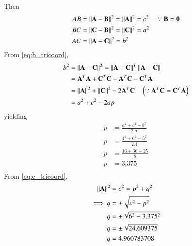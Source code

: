 \documentclass[journal,12pt,twocolumn]{IEEEtran}
\begin{document}
Then
\begin{align}
\label{eq:c_tricoord}
AB &= \left\lVert\mathbf{A}-\mathbf{B}\right\rVert^2 = \left\lVert\mathbf{A}\right\rVert^2  = c^2 \quad \because \mathbf{B} = \mathbf{0}
\\
\label{eq:a_tricoord}
BC &= \left\lVert\mathbf{C}-\mathbf{B}\right\rVert^2 = \left\lVert\mathbf{C}\right\rVert^2  = a^2
\\
AC &= \left\lVert\mathbf{A}-\mathbf{C}\right\rVert^2 =    b^2
\label{eq:b_tricoord}
\end{align}
%
From \eqref{eq:b_tricoord},
\begin{align}
b^2 &=\left\lVert\mathbf{A}-\mathbf{C}\right\rVert^2 = \left\lVert\mathbf{A}-\mathbf{C}\right\rVert^T\left\lVert\mathbf{A}-\mathbf{C}\right\rVert  
\\
&= \mathbf{A}^T\mathbf{A}+\mathbf{C}^T\mathbf{C}-\mathbf{A}^T\mathbf{C} - \mathbf{C}^T\mathbf{A} 
\\
&= \left\lVert\mathbf{A}\right\rVert^2 + \left\lVert\mathbf{C}\right\rVert^2 - 2\mathbf{A}^T\mathbf{C} \quad \left(\because \mathbf{A}^T\mathbf{C} = \mathbf{C}^T\mathbf{A} \right) 
\label{eq:tri_const_norm_ac}
\\
&= a^2+c^2-2ap
\end{align}
%
yielding
\begin{align}
p&= \frac{a^2+c^2-b^2}{2.a}
\\
p&= \frac{4^2+6^2-5^2}{2.4}
\\
p&= \frac{16+36-25}{8}
\\
p&= 3.375
\\
\end{align}
%
From \eqref{eq:c_tricoord}, 
\begin{align}
\left\lVert\mathbf{A}\right\rVert^2 &= c^2 = p^2+q^2
\\
\implies q&= \pm \sqrt{c^2-p^2}
\\
q&= \pm \sqrt{6^2-3.375^2}
\\
q&= \pm \sqrt{24.609375}
\\
q&= 4.960783708
\end{align}
\end{document}
